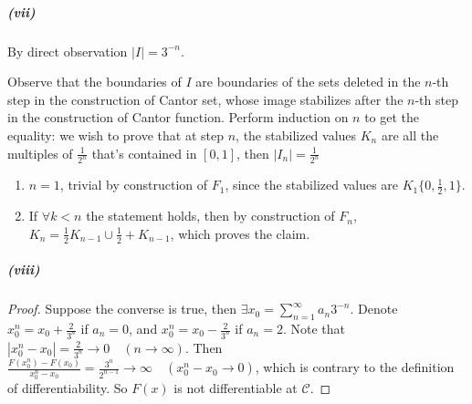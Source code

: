 \documentclass{article}
\begin{document}
\subparagraph{(vii)}
By direct observation $|I|=3^{-n}$.

Observe that the boundaries of $I$ are boundaries of the sets deleted in the $n$-th step in the construction of Cantor set, whose image stabilizes after the $n$-th step in the construction of Cantor function. Perform induction on $n$ to get the equality: we wish to prove that at step $n$, the stabilized values $K_n$ are all the multiples of $\frac {1}{2^n}$ that's contained in $[0,1]$, then $|I_n|=\frac{1}{2^n}$
\begin{enumerate}
\item $n=1$, trivial by construction of $F_1$, since the stabilized values are $K_1\{0,\frac 1 2, 1\}.$
\item If $\forall k<n$ the statement holds, then by construction of $F_n$, $K_n=\frac{1}{2}K_{n-1}\cup \frac{1}{2}+K_{n-1}$, which proves the claim.
\end{enumerate}

\subparagraph{(viii)}
\begin{proof}
Suppose the converse is true, then $\exists x_0=\sum\limits_{n=1}^\infty a_n 3^{-n}$. Denote $x_0^n=x_0+\frac{2}{3^n}$ if $a_n=0$, and $x^n_0=x_0-\frac{2}{3^n}$ if $a_n=2$. Note that $|x^n_0-x_0|=\frac{2}{3^n}\to 0\quad (n\to\infty)$. Then $\frac{F(x^n_0)-F(x_0)}{x^n_0-x_0}=\frac{3^n}{2^{n-1}}\to\infty\quad(x^n_0-x_0\to 0)$, which is contrary to the definition of differentiability. So $F(x)$ is not differentiable at $\mathcal{C}$.
\end{proof}
\end{document}
